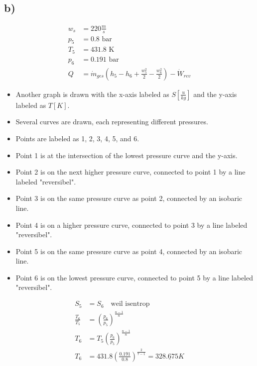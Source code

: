 

\subsection*{b)}

\begin{align*}
    w_s &= 220 \frac{m}{s} \\
    p_5 &= 0.8 \text{ bar} \\
    T_5 &= 431.8 \text{ K} \\
    p_6 &= 0.191 \text{ bar} \\
    Q &= \dot{m}_{ges} \left( h_5 - h_6 + \frac{w_5^2}{2} - \frac{w_6^2}{2} \right) - \dot{W}_{rev}
\end{align*}

\begin{itemize}
    \item Another graph is drawn with the x-axis labeled as $S \left[ \frac{u}{kg} \right]$ and the y-axis labeled as $T \left[ K \right]$.
    \item Several curves are drawn, each representing different pressures.
    \item Points are labeled as 1, 2, 3, 4, 5, and 6.
    \item Point 1 is at the intersection of the lowest pressure curve and the y-axis.
    \item Point 2 is on the next higher pressure curve, connected to point 1 by a line labeled "reversibel".
    \item Point 3 is on the same pressure curve as point 2, connected by an isobaric line.
    \item Point 4 is on a higher pressure curve, connected to point 3 by a line labeled "reversibel".
    \item Point 5 is on the same pressure curve as point 4, connected by an isobaric line.
    \item Point 6 is on the lowest pressure curve, connected to point 5 by a line labeled "reversibel".
\end{itemize}

\begin{align*}
    S_5 &= S_6 \quad \text{weil isentrop} \\
    \frac{T_6}{T_5} &= \left( \frac{p_6}{p_5} \right)^{\frac{n-1}{n}} \\
    T_6 &= T_5 \left( \frac{p_6}{p_5} \right)^{\frac{n-1}{n}} \\
    T_6 &= 431.8 \left( \frac{0.191}{0.8} \right)^{\frac{2}{7-1}} = \underline{328.675 K}
\end{align*}

